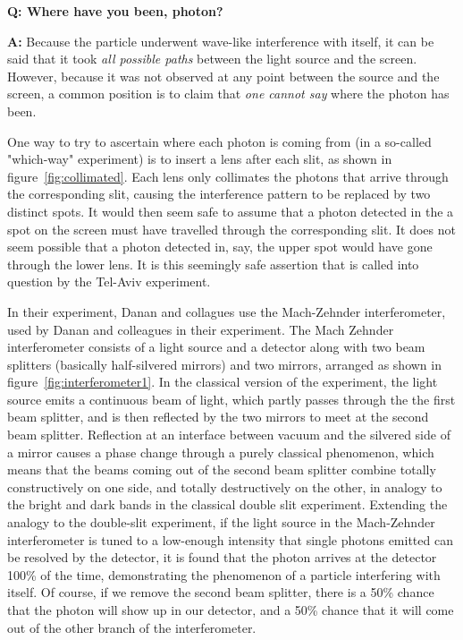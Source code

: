 \documentclass{article}
\newcommand{\Q}{\bfseries Q: }
\newcommand{\A}{\par\textbf{A:} \normalfont}
\begin{document}
\begin{framed}
\Q Where have you been, photon?  

\A Because the particle underwent wave-like interference with itself, it can be 
	said that it took \textit{all possible paths} between the light source 
	and the screen.  However, because it was not observed at any point 
	between the source and the screen, a common position is to claim that
	\textit{one cannot say} where the photon has been.
\end{framed}

One way to try to ascertain where each photon is coming from (in a so-called 
"which-way" experiment) is to insert a lens after each slit, as shown in 
figure~\ref{fig:collimated}.  Each lens only collimates the photons that arrive 
through the corresponding slit, causing the interference pattern to be replaced 
by two distinct spots. It would then seem safe to assume that a photon detected 
in the a spot on the screen must have travelled through the corresponding slit.  
It does not seem possible that a photon detected in, say, the upper spot would 
have gone through the lower lens. It is this seemingly safe assertion that is 
called into question by the Tel-Aviv experiment. 

In their experiment, Danan and collagues use the Mach-Zehnder interferometer, 
used by Danan and colleagues in their experiment.  The Mach Zehnder 
interferometer consists of a light source and a detector along with two beam 
splitters (basically half-silvered mirrors) and two mirrors, arranged as shown 
in figure~\ref{fig:interferometer1}. In the classical version of the 
experiment, the light source emits a continuous beam of light, which partly 
passes through the the first beam splitter, and is then reflected by the two 
mirrors to meet at the second beam splitter. Reflection at an interface between 
vacuum and the silvered side of a mirror causes a phase change through a purely 
classical phenomenon, which means that the beams coming out of the second beam 
splitter combine totally constructively on one side, and totally destructively 
on the other, in analogy to the bright and dark bands in the classical double 
slit experiment. Extending the analogy to the double-slit experiment, if the 
light source in the Mach-Zehnder interferometer is tuned to a low-enough 
intensity that single photons emitted can be resolved by the detector, it is 
found that the photon arrives at the detector 100\% of the time, demonstrating 
the phenomenon of a particle interfering with itself. Of course, if we remove 
the second beam splitter, there is a 50\% chance that the photon will show up 
in our detector, and a 50\% chance that it will come out of the other branch of 
the interferometer. 
\end{document}
